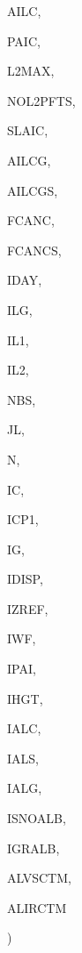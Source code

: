 {\begin{DoxyParamCaption}
\item[{real, dimension  (ilg,ic)}]{A\+I\+L\+C, }
\item[{real, dimension (ilg,ic)}]{P\+A\+I\+C, }
\item[{integer}]{L2\+M\+A\+X, }
\item[{integer, dimension(ic)}]{N\+O\+L2\+P\+F\+T\+S, }
\item[{real, dimension(ilg,ic)}]{S\+L\+A\+I\+C, }
\item[{real, dimension (ilg,ictem)}]{A\+I\+L\+C\+G, }
\item[{real, dimension(ilg,ictem)}]{A\+I\+L\+C\+G\+S, }
\item[{real, dimension(ilg,ictem)}]{F\+C\+A\+N\+C, }
\item[{real, dimension(ilg,ictem)}]{F\+C\+A\+N\+C\+S, }
\item[{integer}]{I\+D\+A\+Y, }
\item[{integer}]{I\+L\+G, }
\item[{integer}]{I\+L1, }
\item[{integer}]{I\+L2, }
\item[{integer}]{N\+B\+S, }
\item[{integer}]{J\+L, }
\item[{integer}]{N, }
\item[{integer}]{I\+C, }
\item[{integer}]{I\+C\+P1, }
\item[{integer}]{I\+G, }
\item[{integer}]{I\+D\+I\+S\+P, }
\item[{integer}]{I\+Z\+R\+E\+F, }
\item[{integer}]{I\+W\+F, }
\item[{integer}]{I\+P\+A\+I, }
\item[{integer}]{I\+H\+G\+T, }
\item[{integer}]{I\+A\+L\+C, }
\item[{integer}]{I\+A\+L\+S, }
\item[{integer}]{I\+A\+L\+G, }
\item[{integer}]{I\+S\+N\+O\+A\+L\+B, }
\item[{integer}]{I\+G\+R\+A\+L\+B, }
\item[{real, dimension(ilg,ic)}]{A\+L\+V\+S\+C\+T\+M, }
\item[{real, dimension(ilg,ic)}]{A\+L\+I\+R\+C\+T\+M}
\end{DoxyParamCaption}
)}\label{CLASSA_8f_ad4c630143a7ebd581213e2acfaf3643e}

